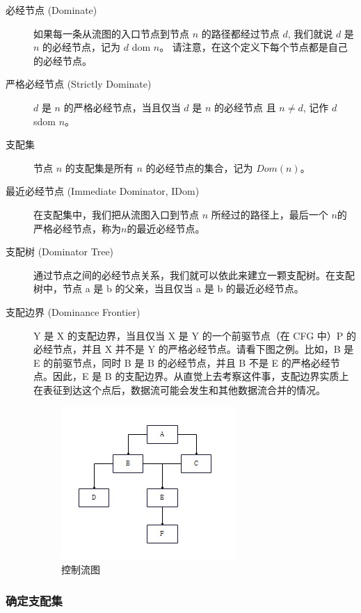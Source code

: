 \begin{description}
    \item[必经节点 (Dominate)]
    如果每一条从流图的入口节点到节点 $n$ 的路径都经过节点 $d$, 我们就说 $d$ 是 $n$ 的必经节点，记为 $d$ dom $n$。
    请注意，在这个定义下每个节点都是自己的必经节点。

    \item[严格必经节点 (Strictly Dominate)]
    $d$ 是 $n$ 的严格必经节点，当且仅当 $d$ 是 $n$ 的必经节点 且 $n\neq d$, 记作 $d$ sdom $n$。

    \item[支配集]
    节点 $n$ 的支配集是所有 $n$ 的必经节点的集合，记为 $\mathit{Dom}(n)$。

    \item[最近必经节点 (Immediate Dominator, IDom)]
    在支配集中，我们把从流图入口到节点 $n$ 所经过的路径上，最后一个 $n$的严格必经节点，称为$n$的最近必经节点。

    \item[支配树 (Dominator Tree)]
    通过节点之间的必经节点关系，我们就可以依此来建立一颗支配树。在支配树中，节点 a 是 b 的父亲，当且仅当 a 是 b 的最近必经节点。

    \item[支配边界 (Dominance Frontier)]
    Y 是 X 的支配边界，当且仅当 X 是 Y 的一个前驱节点（在 CFG 中）P 的必经节点，并且 X 并不是 Y 的严格必经节点。请看下图之例。比如，B 是 E 的前驱节点，同时 B 是 B 的必经节点，并且 B 不是 E 的严格必经节点。因此，E 是 B 的支配边界。从直觉上去考察这件事，支配边界实质上在表征到达这个点后，数据流可能会发生和其他数据流合并的情况。
    \begin{figure}[h]
        \centering
        \includegraphics[width=0.5\linewidth]{CTG.jpg}
        \caption{控制流图}
        \label{fig:enter-label}
    \end{figure}
\end{description}

\subsubsection{确定支配集}

